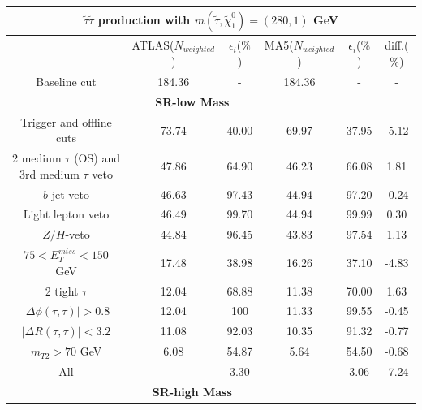 \documentclass{ws-mpla}
\begin{document}
\begin{table}[h!]
  {\begin{tabular}{@{}c c c c c c@{}} \toprule
\hline
\multicolumn{6}{c}{ \textbf{$ \tilde{\tau}\tilde{\tau} $ production with $ m(\tilde{\tau},\tilde{\chi}^0_1) = (280,1) $ GeV} }\\
\hline\hline
 & ATLAS($N_{weighted}$) & $\epsilon_i$($\%$) & MA5($N_{weighted}$) & $\epsilon_i$($\%$) & diff.($\%$) \\
\hline\hline

Baseline cut                                    &   184.36 &     - &   184.36 &     - &      - \\ \hline
%
\multicolumn{5}{c}{ \textbf{SR-low Mass} }\\\hline
Trigger and offline cuts                        &    73.74 & 40.00 &    69.97 & 37.95 &  -5.12 \\ \hline
2 medium $\tau$ (OS) and 3rd medium $\tau$ veto &    47.86 & 64.90 &    46.23 & 66.08 &   1.81 \\ \hline
$b$-jet veto                                    &    46.63 & 97.43 &    44.94 & 97.20 &  -0.24 \\ \hline
Light lepton veto                               &    46.49 & 99.70 &    44.94 & 99.99 &   0.30 \\ \hline
$Z/H$-veto                                      &    44.84 & 96.45 &    43.83 & 97.54 &   1.13 \\ \hline
$ 75 < E^{miss}_T < 150 $ GeV                   &    17.48 & 38.98 &    16.26 & 37.10 &  -4.83 \\ \hline
2 tight $\tau$                                  &    12.04 & 68.88 &    11.38 & 70.00 &   1.63 \\ \hline
$ |\Delta\phi(\tau,\tau)| > 0.8 $               &    12.04 &   100 &    11.33 & 99.55 &  -0.45 \\ \hline
$ |\Delta R(\tau,\tau)| < 3.2 $                 &    11.08 & 92.03 &    10.35 & 91.32 &  -0.77 \\ \hline
$ m_{T2} > 70 $ GeV                             &     6.08 & 54.87 &     5.64 & 54.50 &  -0.68 \\ \hline
All                                             &        - &  3.30 &        - &  3.06 &  -7.24 \\ \hline
%
\multicolumn{5}{c}{ \textbf{SR-high Mass} }\\\hline

\end{tabular}}
\end{table}
\end{document}

